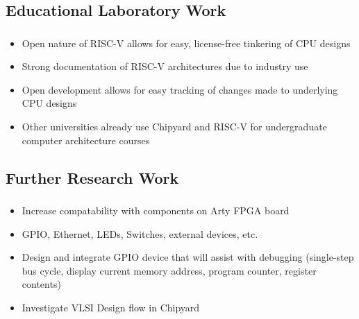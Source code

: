 \documentclass{eceday}
\begin{document}
\subsection{Educational Laboratory Work}\label{subsec:Educational_Lab_Work}
\begin{frame}
  \frametitle{}
  \begin{itemize}
  \item Open nature of RISC-V allows for easy, license-free tinkering of CPU designs
  \item Strong documentation of RISC-V architectures due to industry use
  \item Open development allows for easy tracking of changes made to underlying CPU designs
  \item Other universities already use Chipyard and RISC-V for undergraduate computer architecture courses
  \end{itemize}
\end{frame}

\subsection{Further Research Work}\label{subsec:Further_Research_Work}
\begin{frame}
  \frametitle{}
  \begin{itemize}
  	\item Increase compatability with components on Arty FPGA board
  	\item GPIO, Ethernet, LEDs, Switches, external devices, etc.
  	\item Design and integrate GPIO device that will assist with debugging (single-step bus cycle, display current memory address, program counter, register contents)
  	\item Investigate VLSI Design flow in Chipyard

  \end{itemize}
\end{frame}
\end{document}
